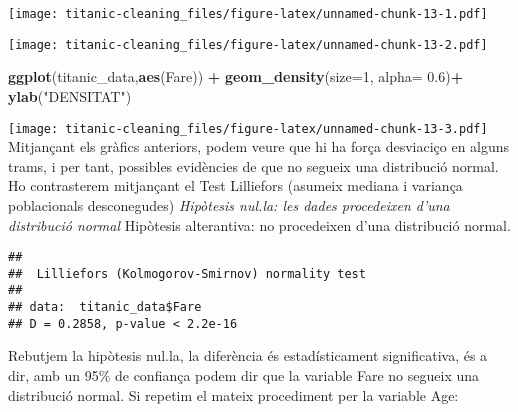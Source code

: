 \documentclass[]{article}
\newenvironment{Shaded}{\begin{snugshade}}{\end{snugshade}}
\newcommand{\CommentTok}[1]{\textcolor[rgb]{0.56,0.35,0.01}{\textit{#1}}}
\newcommand{\DataTypeTok}[1]{\textcolor[rgb]{0.13,0.29,0.53}{#1}}
\newcommand{\DecValTok}[1]{\textcolor[rgb]{0.00,0.00,0.81}{#1}}
\newcommand{\FloatTok}[1]{\textcolor[rgb]{0.00,0.00,0.81}{#1}}
\newcommand{\KeywordTok}[1]{\textcolor[rgb]{0.13,0.29,0.53}{\textbf{#1}}}
\newcommand{\NormalTok}[1]{#1}
\newcommand{\OperatorTok}[1]{\textcolor[rgb]{0.81,0.36,0.00}{\textbf{#1}}}
\newcommand{\StringTok}[1]{\textcolor[rgb]{0.31,0.60,0.02}{#1}}
\begin{document}
\texttt{[image: titanic-cleaning\_files/figure-latex/unnamed-chunk-13-1.pdf]}

\begin{Shaded}
\end{Shaded}

\texttt{[image: titanic-cleaning\_files/figure-latex/unnamed-chunk-13-2.pdf]}

\begin{Shaded}
\begin{Highlighting}[]
\KeywordTok{ggplot}\NormalTok{(titanic_data,}\KeywordTok{aes}\NormalTok{(Fare)) }\OperatorTok{+}\StringTok{ }\KeywordTok{geom_density}\NormalTok{(}\DataTypeTok{size=}\DecValTok{1}\NormalTok{, }\DataTypeTok{alpha=} \FloatTok{0.6}\NormalTok{)}\OperatorTok{+}\StringTok{ }\KeywordTok{ylab}\NormalTok{(}\StringTok{"DENSITAT"}\NormalTok{)}
\end{Highlighting}
\end{Shaded}

\texttt{[image: titanic-cleaning\_files/figure-latex/unnamed-chunk-13-3.pdf]}
Mitjançant els gràfics anteriors, podem veure que hi ha força desviaciço
en alguns trams, i per tant, possibles evidències de que no segueix una
distribució normal. Ho contrasterem mitjançant el Test Lilliefors
(asumeix mediana i variança poblacionals desconegudes) \emph{Hipòtesis
nul.la: les dades procedeixen d'una distribució normal }Hipòtesis
alterantiva: no procedeixen d'una distribució normal.

\begin{Shaded}
\end{Shaded}

\begin{verbatim}
## 
##  Lilliefors (Kolmogorov-Smirnov) normality test
## 
## data:  titanic_data$Fare
## D = 0.2858, p-value < 2.2e-16
\end{verbatim}

Rebutjem la hipòtesis nul.la, la diferència és estadísticament
significativa, és a dir, amb un 95\% de confiança podem dir que la
variable Fare no segueix una distribució normal. Si repetim el mateix
procediment per la variable Age:
\end{document}
